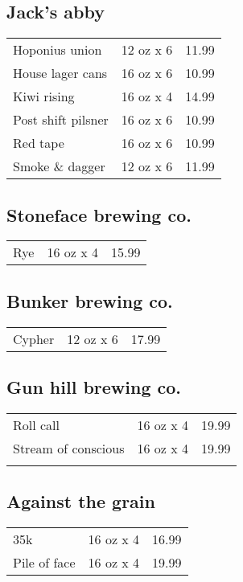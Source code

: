 \documentclass{article}%
\begin{document}
\begin{multicols}{3}
%
\subsection*{Jack's abby}%
\begin{tabular}{l c r}%
Hoponius union&12 oz x 6&11.99\\%
House lager cans&16 oz x 6&10.99\\%
Kiwi rising&16 oz x 4&14.99\\%
Post shift pilsner&16 oz x 6&10.99\\%
Red tape&16 oz x 6&10.99\\%
Smoke \& dagger&12 oz x 6&11.99\\%
\end{tabular}

%
\subsection*{Stoneface brewing co.}%
\begin{tabular}{l c r}%
Rye&16 oz x 4&15.99\\%
\end{tabular}

%
\subsection*{Bunker brewing co.}%
\begin{tabular}{l c r}%
Cypher&12 oz x 6&17.99\\%
\end{tabular}

%
\subsection*{Gun hill brewing co.}%
\begin{tabular}{l c r}%
Roll call&16 oz x 4&19.99\\%
\multirow{1}{15ex}{Stream of conscious}&16 oz x 4&19.99\\%
&&\\%
\end{tabular}

%
\subsection*{Against the grain}%
\begin{tabular}{l c r}%
35k&16 oz x 4&16.99\\%
Pile of face&16 oz x 4&19.99\\%
\end{tabular}


\end{multicols}
\end{document}
